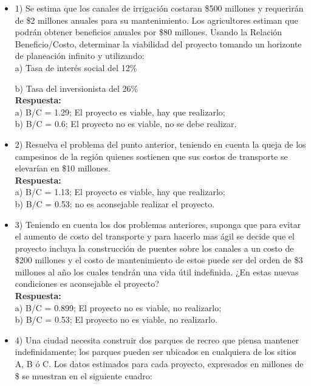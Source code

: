 \begin{itemize}
      
\item 1)	 Se estima que los canales de irrigación costaran \$500 millones y requerirán de \$2 millones anuales para su mantenimiento. Los agricultores estiman que podrán obtener beneficios anuales por \$80 millones. Usando la Relación Beneficio/Costo, determinar la viabilidad del proyecto tomando un horizonte de planeación infinito y utilizando:\\
	      
      a) Tasa de interés social del 12\%
      
      b) Tasa del inversionista del 26\%\\
      
      \textbf{Respuesta:} \\a)  B/C = 1.29;  El proyecto es viable, hay que realizarlo;\\ b)  B/C = 0.6;  El proyecto no es viable, no se debe realizar.
      \medskip
      
\item 2)	Resuelva el problema del punto anterior, teniendo en cuenta la queja de los campesinos de la región quienes sostienen que sus costos de transporte se elevarían en \$10 millones.\\
      
      \textbf{Respuesta:} \\a) B/C = 1.13; El proyecto es viable, hay que realizarlo;\\ b) B/C = 0.53; no es aconsejable realizar el proyecto.
      \medskip
      
\item 3)	Teniendo en cuenta los dos problemas anteriores, suponga que para evitar el aumento de costo del transporte y para hacerlo mas ágil se decide que el proyecto incluya la construcción de puentes sobre los canales a un costo de \$200 millones y el costo de mantenimiento de estos puede ser del orden de \$3 millones al año los cuales tendrán una vida útil indefinida. ¿En estas nuevas condiciones es aconsejable el proyecto?\\
      
      \textbf{Respuesta:} \\a) B/C = 0.899; El proyecto no es viable, no realizarlo;\\ b) B/C = 0.53; El proyecto no es viable, no realizarlo.
      \medskip
      
\item 4)	Una ciudad necesita construir dos parques de recreo que piensa mantener indefinidamente; los parques pueden ser ubicados en cualquiera de los sitios A, B ó C. Los datos estimados para cada proyecto, expresados en millones de \$ se muestran en el siguiente cuadro:\\
      

\end{itemize}
